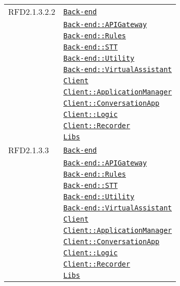 \begin{longtable}{|>{\centering}m{3cm}|m{10cm}<{\centering}|}
RFD2.1.3.2.2 & \hyperref[Back-end]{\texttt{Back-end}}\\
& \hyperref[Back-end::APIGateway]{\texttt{Back-end::APIGateway}}\\
& \hyperref[Back-end::Rules]{\texttt{Back-end::Rules}}\\
& \hyperref[Back-end::STT]{\texttt{Back-end::STT}}\\
& \hyperref[Back-end::Utility]{\texttt{Back-end::Utility}}\\
& \hyperref[Back-end::VirtualAssistant]{\texttt{Back-end::VirtualAssistant}}\\
& \hyperref[Client]{\texttt{Client}}\\
& \hyperref[Client::ApplicationManager]{\texttt{Client::ApplicationManager}}\\
& \hyperref[Client::ConversationApp]{\texttt{Client::ConversationApp}}\\
& \hyperref[Client::Logic]{\texttt{Client::Logic}}\\
& \hyperref[Client::Recorder]{\texttt{Client::Recorder}}\\
& \hyperref[Libs]{\texttt{Libs}}\\ \hline

RFD2.1.3.3 & \hyperref[Back-end]{\texttt{Back-end}}\\
& \hyperref[Back-end::APIGateway]{\texttt{Back-end::APIGateway}}\\
& \hyperref[Back-end::Rules]{\texttt{Back-end::Rules}}\\
& \hyperref[Back-end::STT]{\texttt{Back-end::STT}}\\
& \hyperref[Back-end::Utility]{\texttt{Back-end::Utility}}\\
& \hyperref[Back-end::VirtualAssistant]{\texttt{Back-end::VirtualAssistant}}\\
& \hyperref[Client]{\texttt{Client}}\\
& \hyperref[Client::ApplicationManager]{\texttt{Client::ApplicationManager}}\\
& \hyperref[Client::ConversationApp]{\texttt{Client::ConversationApp}}\\
& \hyperref[Client::Logic]{\texttt{Client::Logic}}\\
& \hyperref[Client::Recorder]{\texttt{Client::Recorder}}\\
& \hyperref[Libs]{\texttt{Libs}}\\ \hline


\end{longtable}
